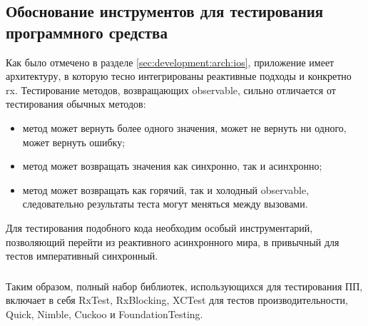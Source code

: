 \subsection{Обоснование инструментов для тестирования программного средства}
\label{sec:testing:tech}

Как было отмечено в разделе \ref{sec:development:arch:ios}, приложение имеет архитектуру, в которую тесно интегрированы реактивные подходы и конкретно \gls{rx}. Тестирование методов, возвращающих \gls{observable}, сильно отличается от тестирования обычных методов:

\begin{itemize}
	\item метод может вернуть более одного значения, может не вернуть ни одного, может вернуть ошибку;
	\item метод может возвращать значения как синхронно, так и асинхронно;
	\item метод может возвращать как горячий, так и холодный \gls{observable}, следовательно результаты теста могут меняться между вызовами.
\end{itemize}

Для тестирования подобного кода необходим особый инструментарий, позволяющий перейти из реактивного асинхронного мира, в привычный для тестов императивный синхронный.




\subsubsection{}
\label{sec:testing:tech:result}
Таким образом, полный набор библиотек, использующихся для тестирования ПП, включает в себя RxTest, RxBlocking, XCTest для тестов производительности, Quick, Nimble, Cuckoo и FoundationTesting.
